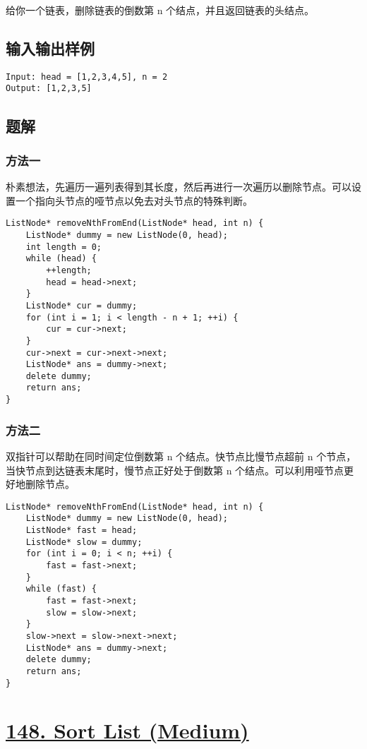 \documentclass[lang=cn,10pt]{elegantbook}
\begin{document}
给你一个链表，删除链表的倒数第 n 个结点，并且返回链表的头结点。

\subsection*{输入输出样例}

\begin{lstlisting}
Input: head = [1,2,3,4,5], n = 2
Output: [1,2,3,5]
\end{lstlisting}

\subsection*{题解}

\subsubsection*{方法一}

朴素想法，先遍历一遍列表得到其长度，然后再进行一次遍历以删除节点。可以设置一个指向头节点的哑节点以免去对头节点的特殊判断。

\begin{lstlisting}
ListNode* removeNthFromEnd(ListNode* head, int n) {
	ListNode* dummy = new ListNode(0, head);
	int length = 0;
	while (head) {
		++length;
		head = head->next;
	}
	ListNode* cur = dummy;
	for (int i = 1; i < length - n + 1; ++i) {
		cur = cur->next;
	}
	cur->next = cur->next->next;
	ListNode* ans = dummy->next;
	delete dummy;
	return ans;
}
\end{lstlisting}

\subsubsection*{方法二}

双指针可以帮助在同时间定位倒数第 n 个结点。快节点比慢节点超前 n 个节点，当快节点到达链表末尾时，慢节点正好处于倒数第 n 个结点。可以利用哑节点更好地删除节点。

\begin{lstlisting}
ListNode* removeNthFromEnd(ListNode* head, int n) {
	ListNode* dummy = new ListNode(0, head);
	ListNode* fast = head;
	ListNode* slow = dummy;
	for (int i = 0; i < n; ++i) {
		fast = fast->next;
	}
	while (fast) {
		fast = fast->next;
		slow = slow->next;
	}
	slow->next = slow->next->next;
	ListNode* ans = dummy->next;
	delete dummy;
	return ans;
}
\end{lstlisting}

{\color{red}\section{\href{https://leetcode.cn/problems/sort-list/}{148. Sort List (Medium)}}} \label{ch13.148}
\end{document}
